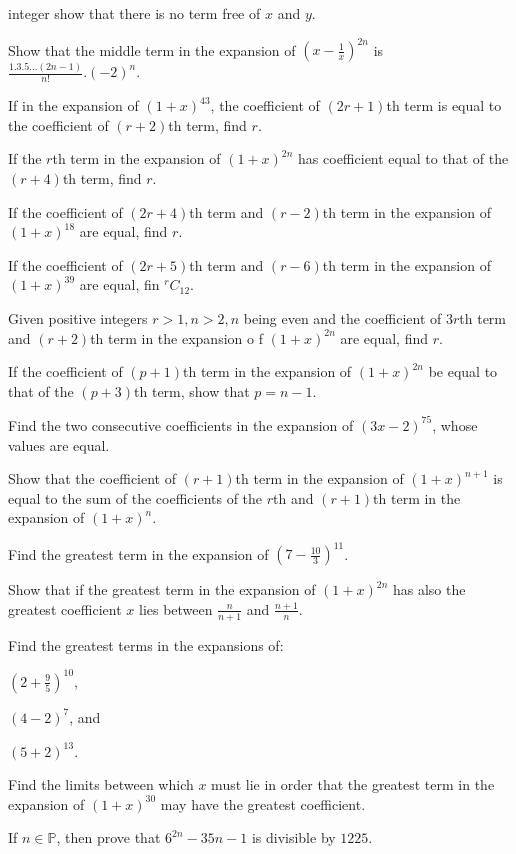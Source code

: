   integer show that there is no term free of $x$ and $y$.
\item Show that the middle term in the expansion of $\left(x - \frac{1}{x}\right)^{2n}$ is $\frac{1.3.5\ldots (2n -1)}{n!}.(-2)^n$.
\item If in the expansion of $(1 + x)^{43}$, the coefficient of $(2r + 1)$th term is equal to the coefficient of $(r + 2)$th term,
  find $r$.
\item If the $r$th term in the expansion of $(1 + x)^{2n}$ has coefficient equal to that of the $(r + 4)$th term, find $r$.
\item If the coefficient of $(2r + 4)$th term and $(r - 2)$th term in the expansion of $(1 + x)^{18}$ are equal, find $r$.
\item If the coefficient of $(2r + 5)$th term and $(r - 6)$th term in the expansion of $(1 + x)^{39}$ are equal, fin ${}^rC_{12}$.
\item Given positive integers $r>1, n>2, n$ being even and the coefficient of $3r$th term and $(r + 2)$th term in the expansion o f
  $(1 + x)^{2n}$ are equal, find $r$.
\item If the coefficient of $(p + 1)$th term in the expansion of $(1 + x)^{2n}$ be equal to that of the $(p + 3)$th term, show that
  $p = n - 1$.
\item Find the two consecutive coefficients in the expansion of $(3x - 2)^{75}$, whose values are equal.
\item Show that the coefficient of $(r + 1)$th term in the expansion of $(1 + x)^{n + 1}$ is equal to the sum of the coefficients
  of the $r$th and $(r + 1)$th term in the expansion of $(1 + x)^n$.
\item Find the greatest term in the expansion of $\left(7 - \frac{10}{3}\right)^{11}$.
\item Show that if the greatest term in the expansion of $(1 + x)^{2n}$ has also the greatest coefficient $x$ lies between
  $\frac{n}{n + 1}$ and $\frac{n + 1}{n}$.
\item Find the greatest terms in the expansions of:
  \startitemize[n]
  \item $\left(2 + \frac{9}{5}\right)^{10}$,
  \item $(4 - 2)^7$, and
  \item $(5 + 2)^{13}$.
  \stopitemize
\item Find the limits between which $x$ must lie in order that the greatest term in the expansion of $(1 + x)^{30}$ may have the
  greatest coefficient.
\item If $n\in\mathbb{P}$, then prove that $6^{2n} - 35n - 1$ is divisible by $1225$.
